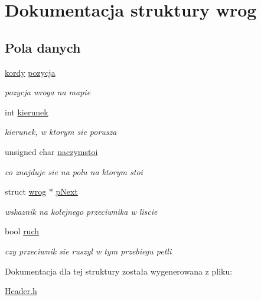 \hypertarget{structwrog}{}\section{Dokumentacja struktury wrog}
\label{structwrog}
\subsection*{Pola danych}
\begin{DoxyCompactItemize}
\item 
\mbox{\label{structwrog_a6bc4ace15697c254db2834c12a331ac4}} 
\mbox{\hyperlink{structkordy}{kordy}} \mbox{\hyperlink{structwrog_a6bc4ace15697c254db2834c12a331ac4}{pozycja}}
\begin{DoxyCompactList}\small\item\em pozycja wroga na mapie \end{DoxyCompactList}\item 
\mbox{\label{structwrog_ac58c0ffe2be66e087bd2922f0f17b2c6}} 
int \mbox{\hyperlink{structwrog_ac58c0ffe2be66e087bd2922f0f17b2c6}{kierunek}}
\begin{DoxyCompactList}\small\item\em kierunek, w ktorym sie porusza \end{DoxyCompactList}\item 
\mbox{\label{structwrog_aa19ec874be86e10a009688a96a608dda}} 
unsigned char \mbox{\hyperlink{structwrog_aa19ec874be86e10a009688a96a608dda}{naczymstoi}}
\begin{DoxyCompactList}\small\item\em co znajduje sie na polu na ktorym stoi \end{DoxyCompactList}\item 
\mbox{\label{structwrog_a89119ce1b8008d972619e2f6ff83b658}} 
struct \mbox{\hyperlink{structwrog}{wrog}} $\ast$ \mbox{\hyperlink{structwrog_a89119ce1b8008d972619e2f6ff83b658}{p\+Next}}
\begin{DoxyCompactList}\small\item\em wskaznik na kolejnego przeciwnika w liscie \end{DoxyCompactList}\item 
\mbox{\label{structwrog_a311cee054a8a6e9cd43ded5964c39420}} 
bool \mbox{\hyperlink{structwrog_a311cee054a8a6e9cd43ded5964c39420}{ruch}}
\begin{DoxyCompactList}\small\item\em czy przeciwnik sie ruszyl w tym przebiegu petli \end{DoxyCompactList}\end{DoxyCompactItemize}


Dokumentacja dla tej struktury została wygenerowana z pliku\+:\begin{DoxyCompactItemize}
\item 
\mbox{\hyperlink{_header_8h}{Header.\+h}}\end{DoxyCompactItemize}
